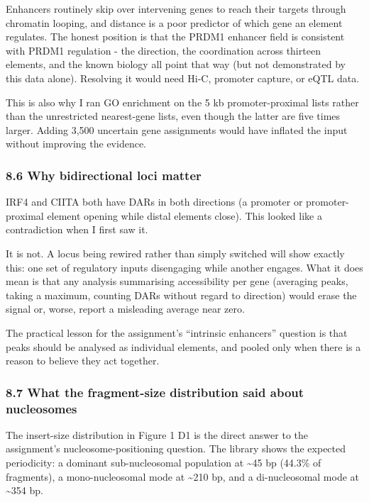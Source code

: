 \documentclass[
  11pt,
  a4paper,
]{article}
\begin{document}
Enhancers routinely skip over intervening genes to reach their targets
through chromatin looping, and distance is a poor predictor of which
gene an element regulates. The honest position is that the PRDM1
enhancer field is consistent with PRDM1 regulation - the direction, the
coordination across thirteen elements, and the known biology all point
that way (but not demonstrated by this data alone). Resolving it would
need Hi-C, promoter capture, or eQTL data.

This is also why I ran GO enrichment on the 5 kb promoter-proximal lists
rather than the unrestricted nearest-gene lists, even though the latter
are five times larger. Adding 3,500 uncertain gene assignments would
have inflated the input without improving the evidence.

\hypertarget{why-bidirectional-loci-matter}{%
\subsubsection{8.6 Why bidirectional loci
matter}\label{why-bidirectional-loci-matter}}

IRF4 and CIITA both have DARs in both directions (a promoter or
promoter-proximal element opening while distal elements close). This
looked like a contradiction when I first saw it.

It is not. A locus being rewired rather than simply switched will show
exactly this: one set of regulatory inputs disengaging while another
engages. What it does mean is that any analysis summarising
accessibility per gene (averaging peaks, taking a maximum, counting DARs
without regard to direction) would erase the signal or, worse, report a
misleading average near zero.

The practical lesson for the assignment's ``intrinsic enhancers''
question is that peaks should be analysed as individual elements, and
pooled only when there is a reason to believe they act together.

\hypertarget{what-the-fragment-size-distribution-said-about-nucleosomes}{%
\subsubsection{8.7 What the fragment-size distribution said about
nucleosomes}\label{what-the-fragment-size-distribution-said-about-nucleosomes}}

The insert-size distribution in Figure 1 D1 is the direct answer to the
assignment's nucleosome-positioning question. The library shows the
expected periodicity: a dominant sub-nucleosomal population at
\textasciitilde45 bp (44.3\% of fragments), a mono-nucleosomal mode at
\textasciitilde210 bp, and a di-nucleosomal mode at \textasciitilde354
bp.
\end{document}
